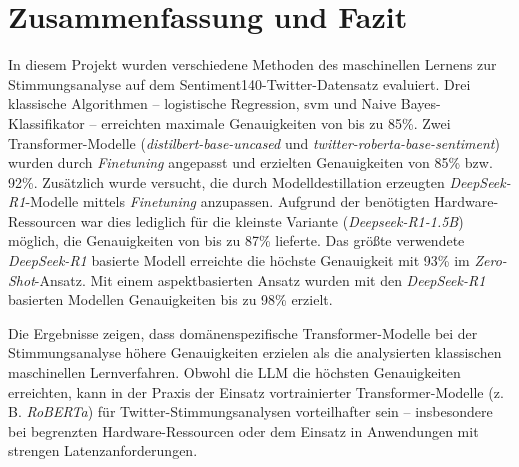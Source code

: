 \section{Zusammenfassung und Fazit}

In diesem Projekt wurden verschiedene Methoden des maschinellen Lernens zur Stimmungsanalyse auf dem Sentiment140-Twitter-Datensatz evaluiert.
Drei klassische Algorithmen – logistische Regression, \gls{svm} und Naive Bayes-Klassifikator – erreichten maximale Genauigkeiten von bis zu 85\%.
Zwei Transformer-Modelle (\emph{distilbert-base-uncased} und \emph{twitter-roberta-base-sentiment}) wurden durch \textit{Finetuning} angepasst und erzielten Genauigkeiten von 85\% bzw. 92\%.
Zusätzlich wurde versucht, die durch Modelldestillation erzeugten \emph{DeepSeek-R1}-Modelle mittels \textit{Finetuning} anzupassen.
Aufgrund der benötigten Hardware-Ressourcen war dies lediglich für die kleinste Variante (\emph{Deepseek-R1-1.5B}) möglich, die Genauigkeiten von bis zu 87\% lieferte.
Das größte verwendete \emph{DeepSeek-R1} basierte Modell erreichte die höchste Genauigkeit mit 93\% im \textit{Zero-Shot}-Ansatz.
Mit einem aspektbasierten Ansatz wurden mit den \emph{DeepSeek-R1} basierten Modellen Genauigkeiten bis zu 98\% erzielt.

Die Ergebnisse zeigen, dass domänenspezifische Transformer-Modelle bei der Stimmungsanalyse höhere Genauigkeiten erzielen als die analysierten klassischen maschinellen Lernverfahren.
Obwohl die LLM die höchsten Genauigkeiten erreichten, kann in der Praxis der Einsatz vortrainierter Transformer-Modelle (z. B. \emph{RoBERTa}) für Twitter-Stimmungsanalysen vorteilhafter sein – insbesondere bei begrenzten Hardware-Ressourcen oder dem Einsatz in Anwendungen mit strengen Latenzanforderungen.
